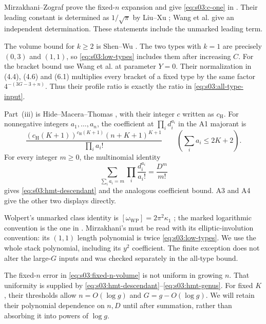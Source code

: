 \begin{prf}
Mirzakhani--Zograf prove the fixed-$n$ expansion and give
\eqref{eq:s03:c-one} in \cite[Theorem~1.2 and Remark~1.3]{MZ15}.
Their leading constant is determined as $1/\sqrt\pi$ by Liu--Xu
\cite[Corollary~1.2]{LX26}; Wang et al.
\cite[Corollary~1.2]{W26} give an independent determination.
These statements include the unmarked leading term.

The volume bound for $k\geq2$ is Shen--Wu
\cite[Lemma~18]{SW25}. The two types with $k=1$ are precisely
$(0,3)$ and $(1,1)$, so \eqref{eq:s03:low-types} includes them after
increasing $C$. For the bracket bound use Wang et al.
\cite[Lemma~6.1, (6.7)]{W26} at parameter $Y=0$. Their
normalization in (4.4), (4.6) and (6.1) multiplies every bracket of a
fixed type by the same factor $4^{-(3G-3+n)}$. Thus their profile ratio
is exactly the ratio in \eqref{eq:s03:all-type-input}.

Part~\textup{(iii)} is Hide--Macera--Thomas
\cite[Theorem~4.2, A1, A3, A4]{HMT25}, with their integer $c$ written
as $c_{\mathrm H}$. For nonnegative integers $a_1,\ldots,a_n$,
the coefficient at $\prod_i d_i^{a_i}$ in the A1 majorant is
\[
\frac{(c_{\mathrm H}(K+1))^{c_{\mathrm H}(K+1)}(n+K+1)^{K+1}}
     {\prod_i a_i!}
\qquad\left(\sum_i a_i\leq2K+2\right).
\]
For every integer $m\geq0$, the multinomial identity
\[
\sum_{\sum_i a_i=m}\prod_i\frac{d_i^{a_i}}{a_i!}=\frac{D^m}{m!}
\]
gives \eqref{eq:s03:hmt-descendant} and the analogous coefficient
bound. A3 and A4 give the other two displays directly.
\end{prf}

\begin{rmk}
Wolpert's unmarked class identity is
$[\omega_{\mathrm{WP}}]=2\pi^2\kappa_1$
\cite[Section~5.1, p.~138]{Wol86}; the marked logarithmic convention
is the one in \cite[Section~2]{MZ15}. Mirzakhani's
\cite[Theorem~4.4 and the discussion on p.~4]{Mir07} must be read
with its elliptic-involution convention: its $(1,1)$ length polynomial
is twice \eqref{eq:s03:low-types}. We use the whole stack polynomial,
including its $y^2$ coefficient. The finite exception does not alter the
large-$G$ inputs and was checked separately in the all-type bound.

The fixed-$n$ error in \eqref{eq:s03:fixed-n-volume} is not uniform
in growing $n$. That uniformity is supplied by
\eqref{eq:s03:hmt-descendant}--\eqref{eq:s03:hmt-genus}.
For fixed $K$, their thresholds allow $n=O(\log g)$ and
$G=g-O(\log g)$. We will retain their polynomial dependence on $n,D$
until after summation, rather than absorbing it into powers of $\log g$.
\end{rmk}
